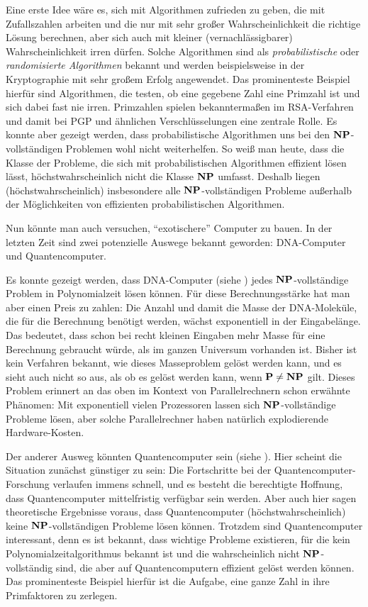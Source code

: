Eine erste Idee wäre es, sich mit Algorithmen zufrieden zu geben, die
mit Zufallszahlen arbeiten und die nur mit sehr großer
Wahrscheinlichkeit die richtige Lösung berechnen, aber sich auch mit
kleiner (vernachlässigbarer) Wahrscheinlichkeit irren dürfen. Solche
Algorithmen sind als \emph{probabilistische} oder \emph{randomisierte
Algorithmen}
bekannt \cite{mora95} und werden beispielsweise in der Kryptographie
mit sehr großem Erfolg angewendet.  Das prominenteste Beispiel hierfür
sind Algorithmen, die testen, ob eine gegebene Zahl eine Primzahl ist
und sich dabei fast nie irren. Primzahlen spielen bekanntermaßen im
RSA-Verfahren und damit bei PGP und ähnlichen Verschlüsselungen eine
zentrale Rolle.  Es konnte aber gezeigt werden, dass probabilistische
Algorithmen uns bei den $\mathbf{N}\mathbf{P}$-vollständigen Problemen wohl nicht
weiterhelfen. So weiß man heute, dass die Klasse der Probleme, die
sich mit probabilistischen Algorithmen effizient lösen lässt,
höchstwahrscheinlich nicht die Klasse $\mathbf{N}\mathbf{P}$ umfasst. Deshalb liegen
(höchstwahrscheinlich) insbesondere alle $\mathbf{N}\mathbf{P}$-vollständigen Probleme
außerhalb der Möglichkeiten von effizienten probabilistischen
Algorithmen.

Nun könnte man auch versuchen, "`exotischere"' Computer zu bauen.  In
der letzten Zeit sind zwei potenzielle Auswege bekannt geworden:
DNA-Computer und Quantencomputer.

Es konnte gezeigt werden, dass DNA-Computer (siehe \cite{pau98}) jedes
$\mathbf{N}\mathbf{P}$-vollständige Problem in Polynomialzeit lösen können. Für diese
Berechnungsstärke hat man aber einen Preis zu zahlen: Die Anzahl und
damit die Masse der DNA-Moleküle, die für die Berechnung benötigt
werden, wächst exponentiell in der Eingabelänge. Das bedeutet, dass
schon bei recht kleinen Eingaben mehr Masse für eine Berechnung
gebraucht würde, als im ganzen Universum vorhanden ist. Bisher ist
kein Verfahren bekannt, wie dieses Masseproblem gelöst werden kann,
und es sieht auch nicht so aus, als ob es gelöst werden kann, wenn $\mathbf{P}
\not= \mathbf{N}\mathbf{P}$ gilt. Dieses Problem erinnert an das oben im Kontext von
Parallelrechnern schon erwähnte Phänomen: Mit exponentiell vielen
Prozessoren lassen sich $\mathbf{N}\mathbf{P}$-vollständige Probleme lösen, aber solche
Parallelrechner haben natürlich explodierende Hardware-Kosten.
 
Der anderer Ausweg könnten Quantencomputer sein
(siehe \cite{Ho08,gru99}). Hier scheint die Situation zunächst günstiger zu
sein: Die Fortschritte bei der Quanten\-computer-Forschung verlaufen
immens schnell, und es besteht die berechtigte Hoffnung, dass
Quantencomputer mittelfristig verfügbar sein werden. Aber auch hier
sagen theoretische Ergebnisse voraus, dass Quantencomputer
(höchstwahrscheinlich) keine $\mathbf{N}\mathbf{P}$-vollständigen Probleme lösen
können. Trotzdem sind Quantencomputer interessant, denn es ist
bekannt, dass wichtige Probleme existieren, für die kein
Polynomialzeitalgorithmus bekannt ist und die wahrscheinlich nicht
$\mathbf{N}\mathbf{P}$-vollständig sind, die aber auf Quantencomputern effizient gelöst
werden können. Das prominenteste Beispiel hierfür ist die Aufgabe,
eine ganze Zahl in ihre Primfaktoren zu zerlegen.

